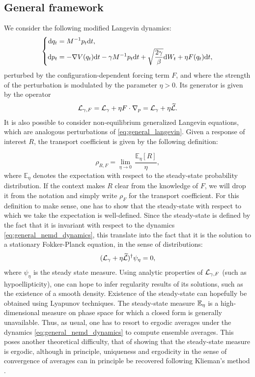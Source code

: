 \subsection{General framework}
We consider the following modified Langevin dynamics:
\begin{equation}
    \label{eq:general_nemd_dynamics}
    \left\{\begin{aligned}
        \text dq_t&=M^{-1}p_t\mathrm{d}t,\\
        \text dp_t&= -\nabla V(q_t)\mathrm{d}t -\gamma M^{-1}p_t\mathrm{d}t+\sqrt{\frac{2\gamma}\beta}\text dW_t +\eta F(q_t)\mathrm{d} t,
    \end{aligned}\right.
\end{equation}
perturbed by the configuration-dependent forcing term $F$, and where the strength of the perturbation is modulated by the parameter $\eta>0$.
Its generator is given by the operator 
\begin{equation}
    \label{eq:nemd_generator}
    \mathcal{L}_{\gamma,F}=\mathcal{L}_\gamma +\eta F\cdot \nabla_p = \mathcal{L}_\gamma +\eta \widetilde{\mathcal{L}}.
\end{equation}
It is also possible to consider non-equilibrium generalized Langevin equations, which are analogous perturbations of \eqref{eq:general_langevin}.
Given a response of interest $R$, the transport coefficient is given by the following definition:

\begin{equation}
    \label{eq:transport_coefficient}
    \rho_{R,F}=\underset{\eta \to 0}{\lim}\, \frac{\mathbb{E}_\eta[R]}{\eta},
\end{equation}
where $\mathbb{E}_\eta$ denotes the expectation with respect to the steady-state probability distribution. 
If the context makes $R$ clear from the knowledge of $F$, we will drop it from the notation and simply write $\rho_F$ for the transport coefficient.
For this definition to make sense, one has to show that the steady-state with respect to which we take the expectation is well-defined.
Since the steady-state is defined by the fact that it is invariant with respect to the dynamics \eqref{eq:general_nemd_dynamics}, 
this translate into the fact that it is the solution to a stationary Fokker-Planck equation, in the sense of distributions:
\begin{equation}
    \label{eq:nemd_fp_equation}
    (\mathcal{L}_\gamma +\eta \widetilde{\mathcal{L}})^\dagger \psi_\eta = 0,
\end{equation}
where $\psi_\eta$ is the steady state measure. Using analytic properties of $\mathcal{L}_{\gamma,F}$ (such as hypoellipticity), one can hope to infer regularity results of its solutions, such as the existence of a smooth density.
Existence of the steady-state can hopefully be obtained using Lyapunov techniques.
The steady-state measure $\mathbb{E}_\eta$ is a high-dimensional measure on phase space for which a closed form is generally unavailable.
Thus, as usual, one has to resort to ergodic averages under the dynamics \eqref{eq:general_nemd_dynamics} to compute ensemble averages.
This poses another theoretical difficulty, that of showing that the steady-state measure is ergodic, although in principle, uniqueness and ergodicity in the sense of convergence of averages can in principle be recovered following Klieman's method \cite{K87}. 

